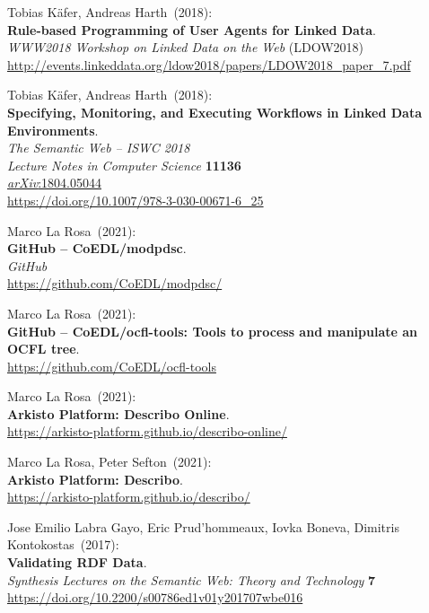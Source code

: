 \begin{thebibliography}{9}
Tobias Käfer, Andreas Harth~(2018): \\
\textbf{Rule-based Programming of User Agents for Linked Data}.\\
\emph{WWW2018 Workshop on Linked Data on the Web} (LDOW2018) \\
\url{http://events.linkeddata.org/ldow2018/papers/LDOW2018_paper_7.pdf}

Tobias Käfer, Andreas Harth~(2018):\\
\textbf{Specifying, Monitoring, and Executing Workflows in Linked Data Environments}.\\
\emph{The Semantic Web – ISWC 2018}\\
\emph{Lecture Notes in Computer Science} \textbf{11136}\\
\href{https://doi.org/10.48550/arXiv.1804.05044}{\emph{arXiv}:1804.05044} \\
\url{https://doi.org/10.1007/978-3-030-00671-6_25}

Marco La Rosa~(2021): \\
\textbf{GitHub -- CoEDL/modpdsc}. \\
\emph{GitHub} \\
\url{https://github.com/CoEDL/modpdsc/}

Marco La Rosa~(2021): \\
\textbf{GitHub -- CoEDL/ocfl-tools: Tools to process and manipulate an OCFL tree}.\\
\url{https://github.com/CoEDL/ocfl-tools}

Marco La Rosa~(2021): \\
\textbf{Arkisto Platform: Describo Online}.\\
\url{https://arkisto-platform.github.io/describo-online/}

Marco La Rosa, Peter Sefton~(2021): \\
\textbf{Arkisto Platform: Describo}.\\
\url{https://arkisto-platform.github.io/describo/}

Jose Emilio Labra Gayo, Eric Prud'hommeaux, Iovka Boneva, Dimitris Kontokostas~(2017): \\
\textbf{Validating {RDF Data}}. \\
\emph{Synthesis Lectures on the Semantic Web: Theory and Technology} \textbf{7} \\
\url{https://doi.org/10.2200/s00786ed1v01y201707wbe016}


\end{thebibliography}

